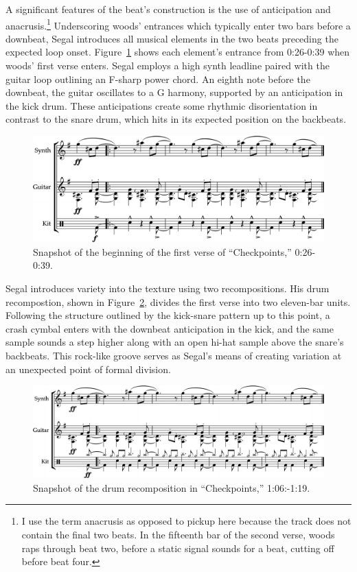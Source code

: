 A significant features of the beat's construction is the use of anticipation and anacrusis.\footnote{
    I use the term anacrusis as opposed to pickup here because the track does not contain
    the final two beats. In the fifteenth bar of the second verse, woods raps through beat two,
    before  a static signal sounds for a beat, cutting off before beat four.} 
Underscoring woods' entrances which typically enter two bars before a downbeat, Segal introduces all
musical elements in the two beats preceding the expected loop onset. Figure~\ref{fig:checkpointsintro} 
shows each element's entrance from 0:26-0:39 when woods' first verse enters. Segal employs a high synth
leadline paired with the guitar loop outlining an F-sharp power chord. An eighth note before the downbeat,
the guitar oscillates to a G harmony, supported by an anticipation in the kick drum. These anticipations
create some rhythmic disorientation in contrast to the snare drum, which hits in its expected position
on the backbeats.

    \begin{figure}[ht]
        \centering
        \includegraphics[width=\textwidth]{images/figures/chp 02/026039checkpointsintro.pdf}
        \caption{Snapshot of the beginning of the first verse of ``Checkpoints,'' 0:26-0:39.}
        \label{fig:checkpointsintro}
    \end{figure}

Segal introduces variety into the texture using two recompositions. His drum recompostion, shown 
in Figure~\ref{fig:checkpointsmain}, divides the first verse  into two eleven-bar units. Following
the structure outlined by the kick-snare pattern up to this point, a crash cymbal enters with the 
downbeat anticipation in the kick, and the same sample sounds a step  higher along with an open 
hi-hat sample above the snare's backbeats. This rock-like groove serves as Segal's means of creating
variation at an unexpected point of formal division.

    \begin{figure}[ht]
        \centering
        \includegraphics[width=\textwidth]{images/figures/chp 02/106119checkpointsmain.pdf}
        \caption{Snapshot of the drum recomposition in ``Checkpoints,'' 1:06:-1:19.}
        \label{fig:checkpointsmain}
    \end{figure}


